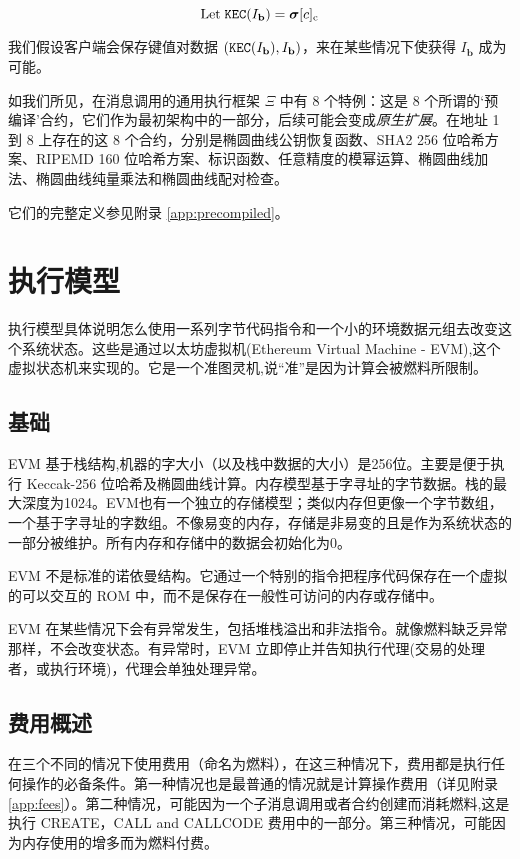 \documentclass[9pt,oneside]{amsart}
\begin{document}
\begin{multicols}{2}
\begin{equation}
\text{Let} \; \mathtt{\tiny KEC}(I_{\mathbf{b}}) = \boldsymbol{\sigma}[c]_{\mathrm{c}}
\end{equation}

我们假设客户端会保存键值对数据 $(\mathtt{\tiny KEC}(I_{\mathbf{b}}), I_{\mathbf{b}})$，来在某些情况下使获得 $I_{\mathbf{b}}$ 成为可能。

如我们所见，在消息调用的通用执行框架 $\Xi$ 中有 8 个特例：这是 8 个所谓的‘预编译’合约，它们作为最初架构中的一部分，后续可能会变成\textit{原生扩展}。在地址 1 到 8 上存在的这 8 个合约，分别是椭圆曲线公钥恢复函数、SHA2 256 位哈希方案、RIPEMD 160 位哈希方案、标识函数、任意精度的模幂运算、椭圆曲线加法、椭圆曲线纯量乘法和椭圆曲线配对检查。

它们的完整定义参见附录 \ref{app:precompiled}。

\section{执行模型} \label{ch:model}
执行模型具体说明怎么使用一系列字节代码指令和一个小的环境数据元组去改变这个系统状态。这些是通过以太坊虚拟机(Ethereum Virtual Machine - EVM),这个虚拟状态机来实现的。它是一个准图灵机,说“准”是因为计算会被燃料所限制。

\subsection{基础}

EVM 基于栈结构,机器的字大小（以及栈中数据的大小）是256位。主要是便于执行 Keccak-256 位哈希及椭圆曲线计算。内存模型基于字寻址的字节数据。栈的最大深度为1024。EVM也有一个独立的存储模型；类似内存但更像一个字节数组，一个基于字寻址的字数组。不像易变的内存，存储是非易变的且是作为系统状态的一部分被维护。所有内存和存储中的数据会初始化为0。

EVM 不是标准的诺依曼结构。它通过一个特别的指令把程序代码保存在一个虚拟的可以交互的 ROM 中，而不是保存在一般性可访问的内存或存储中。

EVM 在某些情况下会有异常发生，包括堆栈溢出和非法指令。就像燃料缺乏异常那样，不会改变状态。有异常时，EVM 立即停止并告知执行代理(交易的处理者，或执行环境)，代理会单独处理异常。

\subsection{费用概述}

在三个不同的情况下使用费用（命名为燃料），在这三种情况下，费用都是执行任何操作的必备条件。第一种情况也是最普通的情况就是计算操作费用（详见附录 \ref{app:fees}）。第二种情况，可能因为一个子消息调用或者合约创建而消耗燃料,这是执行 {\small CREATE}，{\small CALL} and {\small CALLCODE} 费用中的一部分。第三种情况，可能因为内存使用的增多而为燃料付费。


\end{multicols}
\end{document}
